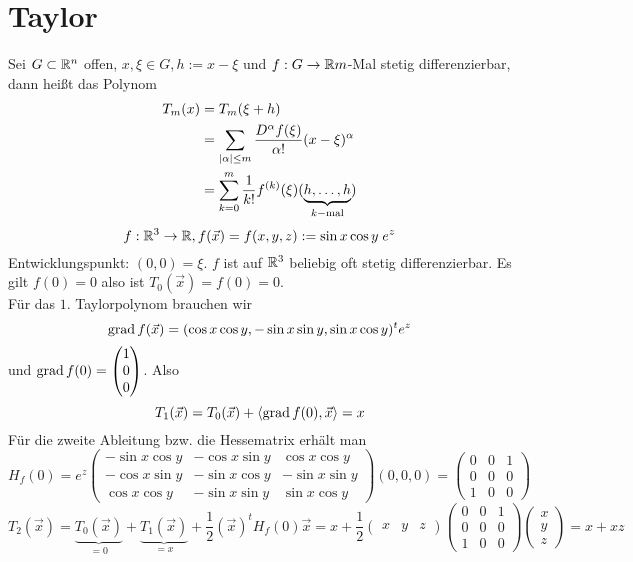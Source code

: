 \documentclass[../ana2u.tex]{subfiles}
\begin{document}
\setcounter{section}{12}
\section{Taylor}

Sei \(G\subset \mathbb{R}^n\) offen, \(x, \xi \in G, h:= x-\xi\)
und \(f:G\rightarrow \mathbb{R} m\)-Mal stetig differenzierbar, dann heißt
das Polynom
\begin{align*}
    T_m(x) &= T_m(\xi+h) \\
    &= \sum_{\left|\alpha\right| \leq m} 
    \frac{D^\alpha f(\xi)}{\alpha!}(x-\xi)^\alpha \\
    &= \sum_{k=0}^m \frac{1}{k!} f^{(k)}(\xi)(\underbrace{h, \ldots, h}_{k-\text{mal}})
\end{align*}
\[ f:\mathbb{R}^3\rightarrow \mathbb{R}, f(\vec{x}) = f(x,y,z) 
:= \sin x \cos y\; e^z \]
Entwicklungspunkt: \( (0,0) = \xi \).
\( f \) ist auf \( \mathbb{R}^3 \) beliebig oft stetig differenzierbar.
Es gilt \( f(0) = 0 \) also ist \(T_0(\vec{x}) = f(0) = 0\). \\
Für das \(1.\) Taylorpolynom brauchen wir
\[ \operatorname{grad} f(\vec{x}) = (\cos x \cos y, -\sin x \sin y, \sin x \cos y)^t e^z \]
und \( \operatorname{grad} f(0) = \begin{pmatrix} 1 \\ 0 \\ 0 \end{pmatrix} \).
Also 
\[ T_1(\vec{x}) = T_0(\vec{x}) + \langle \operatorname{grad} f(0), \vec{x} \rangle = x \]
Für die zweite Ableitung bzw. die Hessematrix erhält man 
\[ H_f(0) = e^z
\begin{pmatrix}
    -\sin x \cos y & -\cos x \sin y & \cos x \cos y \\
    -\cos x \sin y & -\sin x \cos y & -\sin x \sin y \\
    \cos x \cos y & - \sin x \sin y & \sin x \cos y
\end{pmatrix}(0,0,0) = \begin{pmatrix}
    0 & 0 & 1\\
    0 & 0 & 0\\
    1 & 0 & 0
\end{pmatrix} \]
\[ T_2(\vec{x}) = \underbrace{T_0(\vec{x})}_{=0} + \underbrace{T_1(\vec{x})}_{=x} 
+ \frac{1}{2}(\vec{x})^t H_f(0) \vec{x} 
= x + \frac{1}{2}\begin{pmatrix}
    x & y & z
\end{pmatrix} \begin{pmatrix}
    0 & 0 & 1\\
    0 & 0 & 0 \\
    1 & 0 & 0
\end{pmatrix} \begin{pmatrix}
    x \\ y \\ z
\end{pmatrix} = x + xz \]
\end{document}
